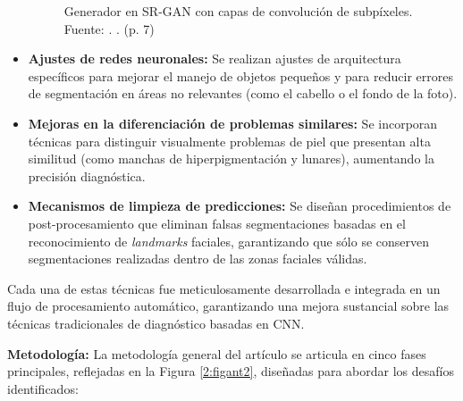 \begin{itemize}
\begin{figure}[H]
\begin{center}
			\caption[Generador en SR-GAN con capas de convolución de subpíxeles]{Generador en SR-GAN con capas de convolución de subpíxeles.\\
				Fuente: \cite{Kim2023}. . (p. 7)}
			\label{2:figant2srgan}
		\end{center}
	\end{figure}
	\item \textbf{Ajustes de redes neuronales:} Se realizan ajustes de arquitectura específicos para mejorar el manejo de objetos pequeños y para reducir errores de segmentación en áreas no relevantes (como el cabello o el fondo de la foto).
    \item \textbf{Mejoras en la diferenciación de problemas similares:} Se incorporan técnicas para distinguir visualmente problemas de piel que presentan alta similitud (como manchas de hiperpigmentación y lunares), aumentando la precisión diagnóstica.
    \item \textbf{Mecanismos de limpieza de predicciones:} Se diseñan procedimientos de post-procesamiento que eliminan falsas segmentaciones basadas en el reconocimiento de \textit{landmarks} faciales, garantizando que sólo se conserven segmentaciones realizadas dentro de las zonas faciales válidas.
\end{itemize}

Cada una de estas técnicas fue meticulosamente desarrollada e integrada en un flujo de procesamiento automático, garantizando una mejora sustancial sobre las técnicas tradicionales de diagnóstico basadas en CNN.

\textbf{Metodología:}
La metodología general del artículo se articula en cinco fases principales, reflejadas en la Figura \ref{2:figant2}, diseñadas para abordar los desafíos identificados:


